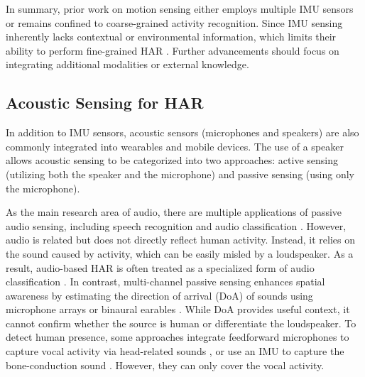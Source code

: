 

In summary, prior work on motion sensing either employs multiple IMU sensors or remains confined to coarse-grained activity recognition. Since IMU sensing inherently
lacks contextual or environmental information, which limits their ability to perform fine-grained HAR \citep{tong2020accelerometers}. Further advancements should focus on integrating additional modalities or external knowledge.

\subsection{Acoustic Sensing for HAR}
In addition to IMU sensors, acoustic sensors (microphones and speakers) are also commonly integrated into wearables and mobile devices. The use of a speaker allows acoustic sensing to be categorized into two approaches: active sensing (utilizing both the speaker and the microphone) and passive sensing (using only the microphone).

As the main research area of audio, there are multiple applications of passive audio sensing, including speech recognition and audio classification \citep{schmid2023efficient}. However, audio is related but does not directly reflect human activity. Instead, it relies on the sound caused by activity, which can be easily misled by a loudspeaker. As a result, audio-based HAR is often treated as a specialized form of audio classification \citep{cristina2024audio}.
In contrast, multi-channel passive sensing enhances spatial awareness by estimating the direction of arrival (DoA) of sounds using microphone arrays \citep{schmidt1986multiple, adavanne2018sound} or binaural earables \citep{yang2022deepear, krause2021joint}. While DoA provides useful context, it cannot confirm whether the source is human or differentiate the loudspeaker. To detect human presence, some approaches integrate feedforward microphones to capture vocal activity via head-related sounds \citep{zhang2024earsavas}, or use an IMU to capture the bone-conduction sound \citep{he2023towards}. However, they can only cover the vocal activity.

